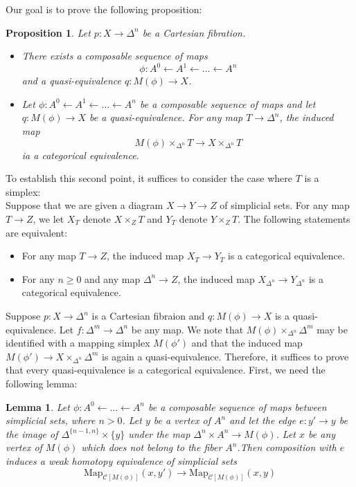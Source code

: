 \documentclass[12pt]{amsart}
\newcommand{\8}{\ensuremath{\infty}}
\newcommand{\Map}{\ensuremath{\text{Map}}}
\newtheorem{lemma}{Lemma}
\newtheorem{proposition}{Proposition}
\begin{document}
Our goal is to prove the following proposition:
\begin{proposition}
  Let $p:X\rightarrow \Delta^n$ be a Cartesian fibration.
  \begin{itemize}
    \item There exists a composable sequence of maps \[\phi:A^0\leftarrow A^1\leftarrow \dots \leftarrow A^n\] and a quasi-equivalence $q:M(\phi)\rightarrow X$.
    \item Let $\phi:A^0\leftarrow A^1\leftarrow \dots\leftarrow A^n$ be a composable sequence of maps and let $q:M(\phi)\rightarrow X$ be a quasi-equivalence. For any map $T\rightarrow \Delta^n$, the induced map \[M(\phi)\times_{\Delta^n}T\rightarrow X\times_{\Delta^n}T\]ia a categorical equivalence.
  \end{itemize}
\end{proposition}

To establish this second point, it suffices to consider the case where $T$ is a simplex:\\
Suppose that we are given a diagram $X\rightarrow Y\rightarrow Z$ of simplicial sets. For any map $T\rightarrow Z$, we let $X_T$ denote $X\times_Z T$ and $Y_T$ denote $Y\times_Z T$. The following statements are equivalent:
\begin{itemize}
  \item For any map $T\rightarrow Z$, the induced map $X_T\rightarrow Y_T$ is a categorical equivalence.
  \item For any $n\geq 0$ and any map $\Delta^n\rightarrow Z$, the induced map $X_{\Delta^n}\rightarrow Y_{\Delta^n}$ is a categorical equivalence.
\end{itemize}

Suppose $p:X\rightarrow\Delta^n$ is a Cartesian fibraion and $q:M(\phi)\rightarrow X$ is a quasi-equivalence. Let $f:\Delta^m\rightarrow \Delta^n$ be any map. We note that $M(\phi)\times_{\Delta^n}\Delta^m$ may be identified with a mapping simplex $M(\phi')$ and that the induced map $M(\phi')\rightarrow X\times_{\Delta^n}\Delta^m$ is again a quasi-equivalence. Therefore, it suffices to prove that every quasi-equivalence is a categorical equivalence. First, we need the following lemma:

\begin{lemma}
  Let $\phi:A^0\leftarrow\dots\leftarrow A^n$ be a composable sequence of maps between simplicial sets, where $n>0$. Let $y$ be a vertex of $A^n$ and let the edge $e:y'\rightarrow y$ be the image of $\Delta^{\{n-1,n\}}\times \{y\}$ under the map $\Delta^n\times A^n\rightarrow M(\phi)$. Let $x$ be any vertex of $M(\phi)$ which does not belong to the fiber $A^n$.Then composition with $e$ induces a weak homotopy equivalence of simplicial sets \[\Map_{\mathscr{C}[M(\phi)]}(x,y')\rightarrow \Map_{\mathscr{C}[M(\phi)]}(x,y)\]
\end{lemma}
\end{document}
